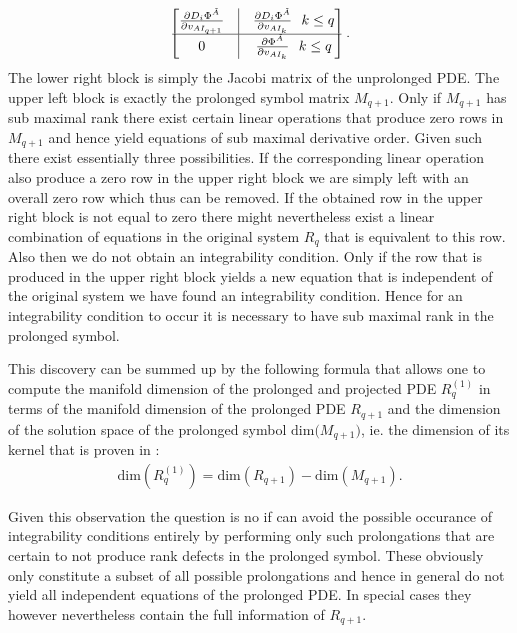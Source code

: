 \documentclass[a4paper,12pt, DIV=14, BCOR=5mm, twoside, headsepline]{scrbook}
\begin{document}
\begin{align}
\begin{bmatrix}
        \frac{\partial D_i\Phi^{\tilde{A}}}{\partial v_{AI_{q+1}}} & \vline & \frac{\partial D_i \Phi^{\tilde{A}}}{\partial v_{AI_k}} \ \ k \leq q \\
        \hline 
        0 & \vline & \frac{\partial \Phi^{\tilde{A}}}{\partial v_{AI_k}} \ \ k \leq q 
\end{bmatrix}.
\end{align}
The lower right block is simply the Jacobi matrix of the unprolonged PDE. The upper left block is exactly the prolonged symbol matrix $M_{q+1}$. Only if $M_{q+1}$ has sub maximal rank there exist certain linear operations that produce zero rows in $M_{q+1}$ and hence yield equations of sub maximal derivative order. Given such there exist essentially three possibilities. If the corresponding linear operation also produce a zero row in the upper right block we are simply left with an overall zero row which thus can be removed. If the obtained row in the upper right block is not equal to zero there might nevertheless exist a linear combination of equations in the original system $R_q$ that is equivalent to this row. Also then we do not obtain an integrability condition. Only if the row that is produced in the upper right block yields a new equation that is independent of the original system we have found an integrability condition.  
Hence for an integrability condition to occur it is necessary to have sub maximal rank in the prolonged symbol.

This discovery can be summed up by the following formula that allows one to compute the manifold dimension of the prolonged and projected PDE $R_q^{(1)}$ in terms of the manifold dimension of the prolonged PDE $R_{q+1}$ and the dimension of the solution space of the prolonged symbol $\mathrm{dim(}M_{q+1})$, ie. the dimension of its kernel that is proven in \cite{seiler1994analysis}:
\begin{align}
    \mathrm{dim}(R_{q}^{(1)}) = \mathrm{dim}(R_{q+1}) - \mathrm{dim}(M_{q+1}).
\end{align}

Given this observation the question is no if can avoid the possible occurance of integrability conditions entirely by performing only such prolongations that are certain to not produce rank defects in the prolonged symbol. These obviously only constitute a subset of all possible prolongations and hence in general do not yield all independent equations of the prolonged PDE. In special cases they however nevertheless contain the full information of $R_{q+1}$.
\end{document}
